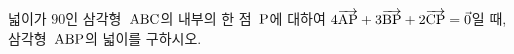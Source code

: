넓이가 $90$인 삼각형~$\mathrm{ABC}$의 내부의 한 점~$\mathrm{P}$에 대하여 $4\overrightarrow{\mathrm{AP}}+3\overrightarrow{\mathrm{BP}}+2\overrightarrow{\mathrm{CP}}=\vec{0}$일 때, 삼각형~$\mathrm{ABP}$의 넓이를 구하시오.
